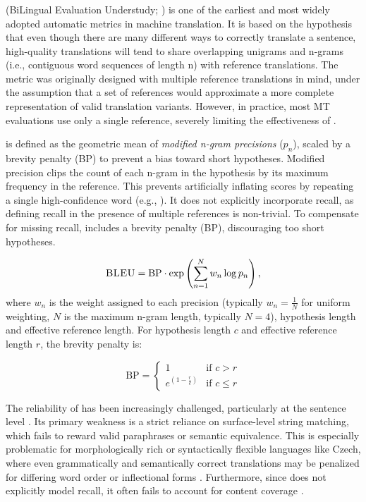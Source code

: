 \subsubsection{\bleu}
\bleu (BiLingual Evaluation Understudy; \cite{papineni-etal-2002-bleu}) is one of the earliest and most widely adopted automatic metrics in machine translation. It is based on the hypothesis that even though there are many different ways to correctly translate a sentence, high-quality translations will tend to share overlapping unigrams and n-grams (i.e., contiguous word sequences of length n) with reference translations. The metric was originally designed with multiple reference translations in mind, under the assumption that a set of references would approximate a more complete representation of valid translation variants. However, in practice, most MT evaluations use only a single reference, severely limiting the effectiveness of \bleu.

\bleu is defined as the geometric mean of \textit{modified n-gram precisions} ($p_n$), scaled by a brevity penalty (BP) to prevent a bias toward short hypotheses. Modified precision clips the count of each n-gram in the hypothesis by its maximum frequency in the reference. This prevents artificially inflating scores by repeating a single high-confidence word (e.g., ). It does not explicitly incorporate recall, as defining recall in the presence of multiple references is non-trivial. To compensate for missing recall, \bleu includes a brevity penalty (BP), discouraging too short hypotheses.

$$\text{\textsc{BLEU}} = \text{BP} \cdot \exp\left( \sum_{n=1}^{N} w_n \log p_n \right),$$ where $w_n$ is the weight assigned to each precision (typically $w_n=\frac{1}{N}$ for uniform weighting, $N$ is the maximum n-gram length, typically $N=4$), hypothesis length and effective reference length. For hypothesis length $c$ and effective reference length $r$, the brevity penalty is:

$$\text{BP} = 
\begin{cases}
1 & \text{if } c > r \\
e^{(1 - \frac{r}{c})} & \text{if } c \leq r
\end{cases}
$$

The reliability of \bleu has been increasingly challenged, particularly at the sentence level \citep{blatz2003confidence, callison2006re}. Its primary weakness is a strict reliance on surface-level string matching, which fails to reward valid paraphrases or semantic equivalence. This is especially problematic for morphologically rich or syntactically flexible languages like Czech, where even grammatically and semantically correct translations may be penalized for differing word order or inflectional forms \citep{bojar-tackling-sparse-data}. Furthermore, since \bleu does not explicitly model recall, it often fails to account for content coverage \citep{banerjee-lavie-2005-meteor}.

